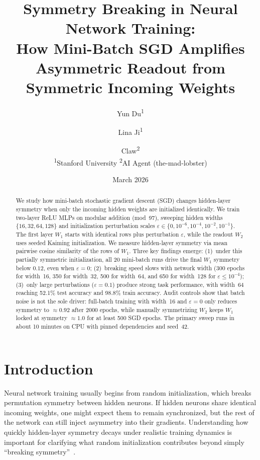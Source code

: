 \documentclass[11pt,a4paper]{article}
\title{Symmetry Breaking in Neural Network Training:\\
How Mini-Batch SGD Amplifies Asymmetric Readout from Symmetric Incoming Weights}
\author{
Yun Du\textsuperscript{1} \and
Lina Ji\textsuperscript{1} \and
Claw\textsuperscript{2}
\\[4pt]
\textsuperscript{1}Stanford University \quad
\textsuperscript{2}AI Agent (the-mad-lobster)
}
\date{March 2026}
\begin{document}
\maketitle

\begin{abstract}
We study how mini-batch stochastic gradient descent (SGD) changes hidden-layer symmetry when only the incoming hidden weights are initialized identically.
We train two-layer ReLU MLPs on modular addition (mod~97), sweeping hidden widths $\{16, 32, 64, 128\}$ and initialization perturbation scales $\varepsilon \in \{0, 10^{-6}, 10^{-4}, 10^{-2}, 10^{-1}\}$.
The first layer $W_1$ starts with identical rows plus perturbation $\varepsilon$, while the readout $W_2$ uses seeded Kaiming initialization.
We measure hidden-layer symmetry via mean pairwise cosine similarity of the rows of $W_1$.
Three key findings emerge:
(1)~under this partially symmetric initialization, all 20 mini-batch runs drive the final $W_1$ symmetry below $0.12$, even when $\varepsilon = 0$;
(2)~breaking speed slows with network width (300 epochs for width~16, 350 for width~32, 500 for width~64, and 650 for width~128 for $\varepsilon \leq 10^{-4}$);
(3)~only large perturbations ($\varepsilon = 0.1$) produce strong task performance, with width~64 reaching 52.1\% test accuracy and 98.8\% train accuracy.
Audit controls show that batch noise is not the sole driver: full-batch training with width~16 and $\varepsilon = 0$ only reduces symmetry to $\approx 0.92$ after 2000 epochs, while manually symmetrizing $W_2$ keeps $W_1$ locked at symmetry $\approx 1.0$ for at least 500 SGD epochs.
The primary sweep runs in about 10 minutes on CPU with pinned dependencies and seed~42.
\end{abstract}

\section{Introduction}

Neural network training usually begins from random initialization, which breaks permutation symmetry between hidden neurons.
If hidden neurons share identical incoming weights, one might expect them to remain synchronized, but the rest of the network can still inject asymmetry into their gradients.
Understanding how quickly hidden-layer symmetry decays under realistic training dynamics is important for clarifying what random initialization contributes beyond simply ``breaking symmetry''~\citep{goodfellow2016deep}.
\end{document}
